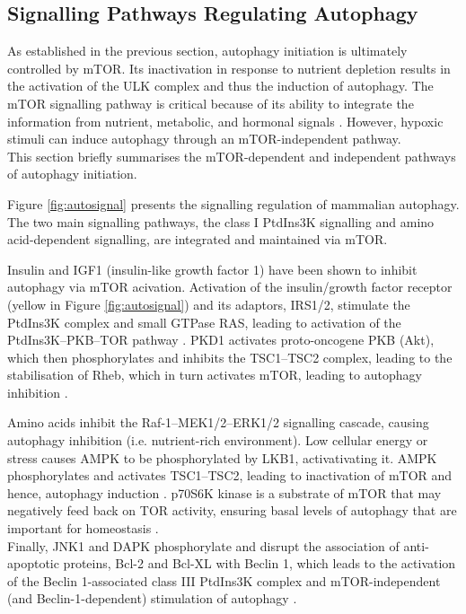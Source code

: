             
            
            
            


    
    \subsection{Signalling Pathways Regulating Autophagy}

    As established in the previous section, autophagy initiation is ultimately controlled by mTOR. Its inactivation in response to nutrient depletion results in the activation of the ULK complex and thus the induction of autophagy. The mTOR signalling pathway is critical because of its ability to integrate the information from nutrient, metabolic, and hormonal signals \cite{lamb2013}.  However, hypoxic stimuli can induce autophagy through an mTOR-independent pathway.\\ 
    This section briefly summarises the mTOR-dependent and independent pathways of autophagy initiation. 
    
    
    \newpage
    Figure \ref{fig:autosignal} presents the signalling regulation of mammalian autophagy. The two main signalling pathways, the class I PtdIns3K signalling and amino acid-dependent signalling, are integrated and maintained via mTOR. 
    
    Insulin and IGF1 (insulin-like growth factor 1) have been shown to inhibit autophagy via mTOR acivation. Activation of the insulin/growth factor receptor (yellow in Figure \ref{fig:autosignal}) and its adaptors, IRS1/2, stimulate the PtdIns3K complex and small GTPase RAS, leading to activation of the PtdIns3K–PKB–TOR pathway \cite{Yang2010}. PKD1 activates proto-oncogene PKB (Akt), which then phosphorylates and inhibits the TSC1–TSC2 complex, leading to the stabilisation of Rheb, which in turn activates mTOR, leading to autophagy inhibition \cite{meijer2004regulation,Yang2010a}.
    
     Amino acids inhibit the Raf-1–MEK1/2–ERK1/2 signalling cascade, causing autophagy inhibition (i.e. nutrient-rich environment). Low cellular energy or stress causes AMPK to be phosphorylated by LKB1, activativating it. AMPK phosphorylates and activates TSC1–TSC2, leading to inactivation of mTOR and hence, autophagy induction \cite{Kroemer2010}. p70S6K kinase is a substrate of mTOR that may negatively feed back on TOR activity, ensuring basal levels of autophagy that are important for homeostasis \cite{Yang2010a}. \\
     Finally, JNK1 and DAPK phosphorylate and disrupt the association of anti-apoptotic proteins, Bcl-2 and Bcl-XL with Beclin 1, which leads to the activation of the Beclin 1-associated class III PtdIns3K complex and mTOR-independent (and Beclin-1-dependent) stimulation of autophagy \cite{wei2008jnk1}. \\
    
